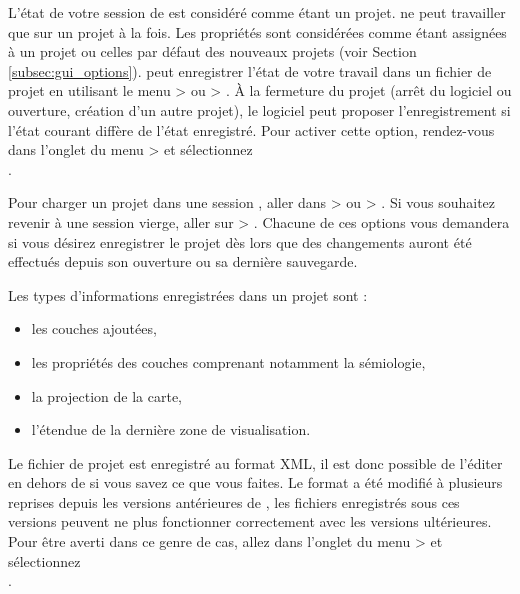 L'état de votre session de \qg est considéré comme étant un projet. \qg ne peut 
travailler que sur un projet à la fois. Les propriétés sont considérées comme 
étant assignées à un projet ou celles par défaut des nouveaux projets (voir 
Section \ref{subsec:gui_options}). \qg peut enregistrer l'état de votre travail 
dans un fichier de projet en utilisant le menu  > 
 ou  
> . À la 
fermeture du projet (arrêt du logiciel ou ouverture, création d'un autre projet), 
le logiciel peut proposer l'enregistrement si l'état courant diffère de l'état 
enregistré. Pour activer cette option, rendez-vous dans l'onglet  
du menu  >  et sélectionnez\\
.

Pour charger un projet dans une session \qg, aller dans  > 
 ou  > 
. Si vous souhaitez revenir à une session 
vierge, aller sur  > .
Chacune de ces options vous demandera si vous désirez enregistrer le projet dès 
lors que des changements auront été effectués depuis son ouverture ou sa dernière 
sauvegarde.

Les types d'informations enregistrées dans un projet sont :

\begin{itemize}[label=--]
\item les couches ajoutées,
\item les propriétés des couches comprenant notamment la sémiologie,
\item la projection de la carte,
\item l'étendue de la dernière zone de visualisation.
\end{itemize}

Le fichier de projet est enregistré au format XML, il est donc possible de 
l'éditer en dehors de \qg si vous savez ce que vous faites. Le format a été 
modifié à plusieurs reprises depuis les versions antérieures de \qg, les 
fichiers enregistrés sous ces versions peuvent ne plus fonctionner correctement 
avec les versions ultérieures. Pour être averti dans ce genre de cas, allez 
dans l'onglet  du menu  >  
et sélectionnez\\
.

